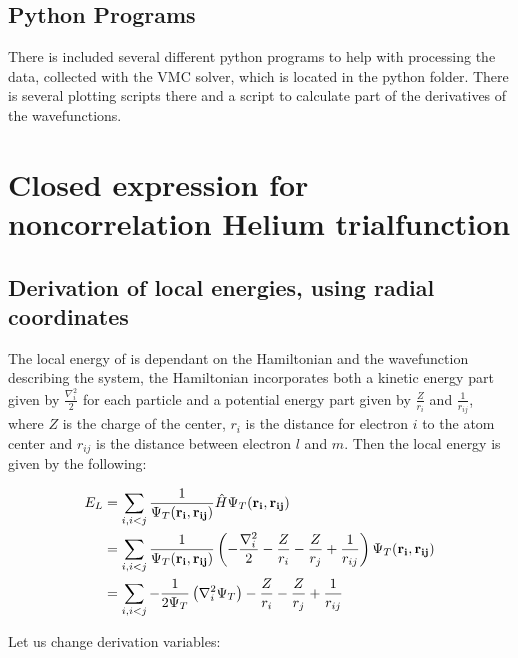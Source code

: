 	\subsection{Python Programs}
		There is included several different python programs to help with processing the data, collected with the VMC solver, which is located in the python folder. There is several plotting scripts there and a script to calculate part of the derivatives of the wavefunctions.

\section{Closed expression for noncorrelation Helium trialfunction}

	\subsection{Derivation of local energies, using radial coordinates}
		The local energy of is dependant on the Hamiltonian and the wavefunction describing the system, the Hamiltonian incorporates both a kinetic energy part given by \( \frac{\nabla_i^2}{2} \) for each particle
		and a potential energy part given by \(\frac{Z}{r_i}\) and \(\frac{1}{r_{ij}}\), where \(Z\) is the charge of the center, \(r_i\) is the distance for electron \(i\) to the atom center and \(r_{ij}\) is the distance between electron \(l\) and \(m\). Then the local energy is given by the following:

		\begin{align}
			E_L &= \sum_{i,i<j}{\frac{1}{ \Psi_T(\vb{r_i} , \vb{r_{ij}}) } \hat{H} \Psi_T(\vb{r_i} , \vb{r_{ij}})}
			\\
			&=	\sum_{i,i<j}\frac{1}{ \Psi_T(\vb{r_i} , \vb{r_{ij}}) } \left( - \frac{\nabla_i^2}{2} -\frac{Z}{r_i}  -  \frac{Z}{r_j} +  \frac{1}{r_{ij} }  \right) \Psi_T(\vb{r_i} , \vb{r_{ij}})
			\\
			&= \sum_{i,i<j}{-\frac{1}{2\Psi_T} \left(\nabla_i^2 \Psi_T  \right)  -\frac{Z}{r_i}  -  \frac{Z}{r_j} +  \frac{1}{r_{ij} }}
		\end{align}

		Let us change derivation variables:

